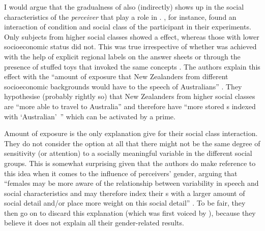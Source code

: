 I would argue that the gradualness of  also (indirectly) shows up in the social characteristics of the \emph{perceiver} that play a role in .
\textcite{hayetal2006a,haydrager2010}, for instance, found an interaction of  condition and social class of the participant in their experiments.
Only subjects from higher social classes showed a  effect, whereas those with lower socioeconomic status did not.
This was true irrespective of whether  was achieved with the help of explicit regional labels on the answer sheets or through the presence of stuffed toys that invoked the same concepts \parencite[cf.][878]{haydrager2010}.
The authors explain this effect with the ``amount of exposure  that New Zealanders from different socioeconomic backgrounds would have to the speech of Australians'' \parencite[878]{haydrager2010}.
They hypothesise (probably rightly so) that New Zealanders from higher social classes are ``more able to travel to Australia'' and therefore have ``more stored s indexed with `Australian'~'' which can be activated by a prime.

Amount of exposure is the only explanation \citeauthor{haydrager2010} give for their social class interaction.
They do not consider the option at all that there might not be the same degree of sensitivity (or attention) to a socially meaningful variable in the different social groups.
This is somewhat surprising given that the authors do make reference to this idea when it comes to the influence of perceivers' gender, arguing that ``females may be more aware of the relationship between variability in speech and social characteristics and may therefore index their s with a larger amount of social detail and/or place more weight on this social detail'' \parencite[884]{haydrager2010}.
To be fair, they then go on to discard this explanation (which was first voiced by \cite{drager2005}), because they believe it does not explain all their gender-related results.

